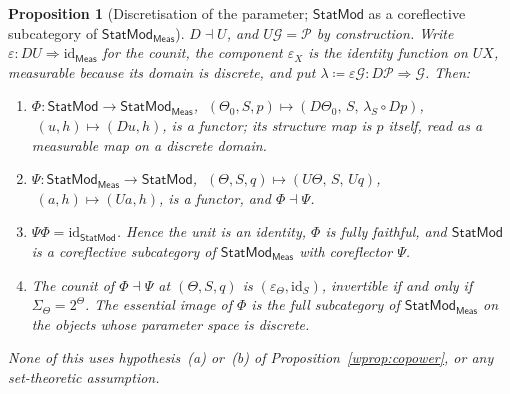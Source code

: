 \documentclass[11pt,a4paper]{article}
\theoremstyle{plain}
\newtheorem{proposition}[theorem]{Proposition}
\theoremstyle{definition}
\theoremstyle{remark}
\newcommand{\cat}[1]{\mathsf{#1}}
\newcommand{\Meas}{\cat{Meas}}
\newcommand{\G}{\mathcal{G}}
\newcommand{\Prb}{\mathcal{P}}
\newcommand{\id}{\mathrm{id}}
\newcommand{\StatMod}{\cat{StatMod}}
\newcommand{\Statk}{\StatMod_{\Meas}}
\begin{document}
\begin{proposition}[Discretisation of the parameter;
$\StatMod$ as a coreflective subcategory of $\Statk$]\label{prop:coreflection}
$D \dashv U$, and $U\G = \Prb$ by construction. Write
$\varepsilon \colon DU \Rightarrow \id_{\Meas}$ for the counit, the
component $\varepsilon_X$ is the identity function on $UX$, measurable because
its domain is discrete, and put
$\lambda \coloneqq \varepsilon\G \colon D\Prb \Rightarrow \G$. Then:
\begin{enumerate}
\item
$\Phi \colon \StatMod \to \Statk$,
$\;(\Theta_0, S, p) \mapsto (D\Theta_0,\, S,\, \lambda_S \circ Dp)$,
$\;(u,h) \mapsto (Du, h)$,
is a functor; its structure map is $p$ itself, read as a measurable map on a
discrete domain.
\item
$\Psi \colon \Statk \to \StatMod$,
$\;(\Theta, S, q) \mapsto (U\Theta,\, S,\, Uq)$,
$\;(a,h) \mapsto (Ua, h)$,
is a functor, and $\Phi \dashv \Psi$.
\item $\Psi\Phi = \id_{\StatMod}$. Hence the unit is an identity,
$\Phi$ is fully faithful, and $\StatMod$ is a coreflective subcategory of
$\Statk$ with coreflector $\Psi$.
\item The counit of $\Phi \dashv \Psi$ at $(\Theta, S, q)$ is
$(\varepsilon_{\Theta}, \id_S)$, invertible if and only if
$\Sigma_{\Theta} = 2^{\Theta}$. The essential image of $\Phi$ is the full
subcategory of $\Statk$ on the objects whose parameter space is discrete.
\end{enumerate}
None of this uses hypothesis~(a) or~(b) of Proposition~\ref{wprop:copower}, or
any set-theoretic assumption.
\end{proposition}
\end{document}
